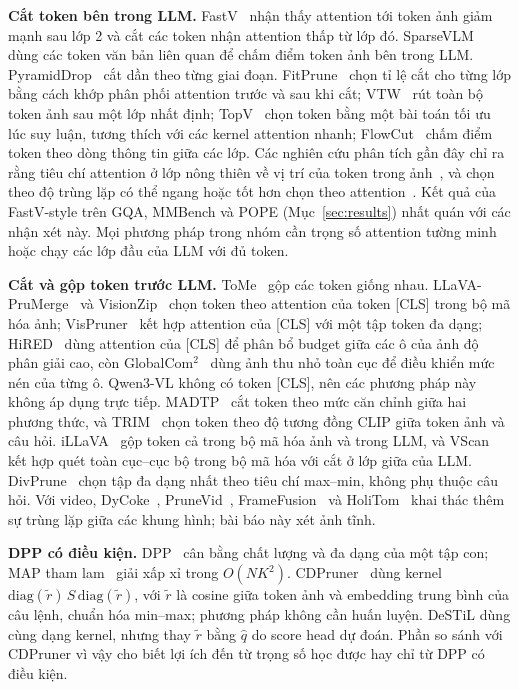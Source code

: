 \documentclass[conference]{IEEEtran}
\newcommand{\qhat}{\ensuremath{\hat{q}}}
\begin{document}
\textbf{Cắt token bên trong LLM.} FastV~\cite{chen2024fastv} nhận thấy attention tới token ảnh giảm mạnh sau lớp 2 và cắt các token nhận attention thấp từ lớp đó. SparseVLM~\cite{zhang2025sparsevlm} dùng các token văn bản liên quan để chấm điểm token ảnh bên trong LLM. PyramidDrop~\cite{xing2025pyramiddrop} cắt dần theo từng giai đoạn. FitPrune~\cite{ye2024fitprune} chọn tỉ lệ cắt cho từng lớp bằng cách khớp phân phối attention trước và sau khi cắt; VTW~\cite{lin2024vtw} rút toàn bộ token ảnh sau một lớp nhất định; TopV~\cite{yang2025topv} chọn token bằng một bài toán tối ưu lúc suy luận, tương thích với các kernel attention nhanh; FlowCut~\cite{tong2025flowcut} chấm điểm token theo dòng thông tin giữa các lớp. Các nghiên cứu phân tích gần đây chỉ ra rằng tiêu chí attention ở lớp nông thiên về vị trí của token trong ảnh~\cite{endo2025feather}, và chọn theo độ trùng lặp có thể ngang hoặc tốt hơn chọn theo attention~\cite{wen2025dart,wen2025rightproblem}. Kết quả của FastV-style trên GQA, MMBench và POPE (Mục~\ref{sec:results}) nhất quán với các nhận xét này. Mọi phương pháp trong nhóm cần trọng số attention tường minh hoặc chạy các lớp đầu của LLM với đủ token.

\textbf{Cắt và gộp token trước LLM.} ToMe~\cite{bolya2023tome} gộp các token giống nhau. LLaVA-PruMerge~\cite{shang2024prumerge} và VisionZip~\cite{yang2025visionzip} chọn token theo attention của token [CLS] trong bộ mã hóa ảnh; VisPruner~\cite{zhang2024vispruner} kết hợp attention của [CLS] với một tập token đa dạng; HiRED~\cite{arif2025hired} dùng attention của [CLS] để phân bổ budget giữa các ô của ảnh độ phân giải cao, còn GlobalCom$^2$~\cite{liu2026globalcom2} dùng ảnh thu nhỏ toàn cục để điều khiển mức nén của từng ô. Qwen3-VL không có token [CLS], nên các phương pháp này không áp dụng trực tiếp. MADTP~\cite{cao2024madtp} cắt token theo mức căn chỉnh giữa hai phương thức, và TRIM~\cite{song2025trim} chọn token theo độ tương đồng CLIP giữa token ảnh và câu hỏi. iLLaVA~\cite{hu2026illava} gộp token cả trong bộ mã hóa ảnh và trong LLM, và VScan~\cite{zhang2025vscan} kết hợp quét toàn cục--cục bộ trong bộ mã hóa với cắt ở lớp giữa của LLM. DivPrune~\cite{alvar2025divprune} chọn tập đa dạng nhất theo tiêu chí max--min, không phụ thuộc câu hỏi. Với video, DyCoke~\cite{tao2024dycoke}, PruneVid~\cite{huang2024prunevid}, FrameFusion~\cite{fu2025framefusion} và HoliTom~\cite{shao2025holitom} khai thác thêm sự trùng lặp giữa các khung hình; bài báo này xét ảnh tĩnh.

\textbf{DPP có điều kiện.} DPP~\cite{kulesza2012dpp} cân bằng chất lượng và đa dạng của một tập con; MAP tham lam~\cite{chen2018fastmap} giải xấp xỉ trong $O(NK^2)$. CDPruner~\cite{zhang2025cdpruner} dùng kernel $\mathrm{diag}(\tilde r)\,S\,\mathrm{diag}(\tilde r)$, với $\tilde r$ là cosine giữa token ảnh và embedding trung bình của câu lệnh, chuẩn hóa min--max; phương pháp không cần huấn luyện. DeSTiL dùng cùng dạng kernel, nhưng thay $\tilde r$ bằng $\qhat$ do score head dự đoán. Phần so sánh với CDPruner vì vậy cho biết lợi ích đến từ trọng số học được hay chỉ từ DPP có điều kiện.
\end{document}

